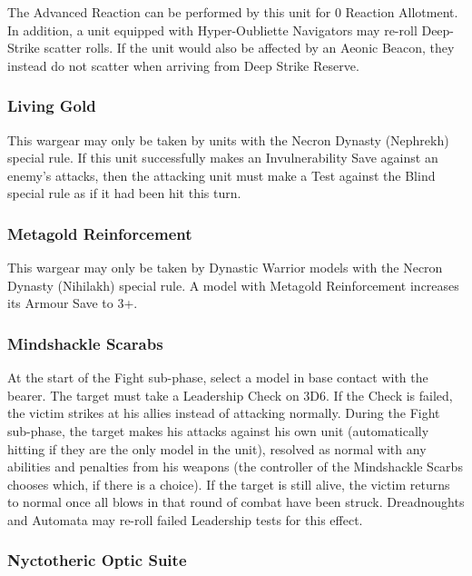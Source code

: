The  Advanced Reaction can be performed by this unit for 0 Reaction Allotment. In addition, a unit equipped with Hyper-Oubliette Navigators may re-roll Deep-Strike scatter rolls.  If the unit would also be affected by an Aeonic Beacon, they instead do not scatter when arriving from Deep Strike Reserve.

\subsubsection{Living Gold} \label{Living Gold}

This wargear may only be taken by units with the Necron Dynasty (Nephrekh) special rule. If this unit successfully makes an Invulnerability Save against an enemy's attacks, then the attacking unit must make a Test against the Blind special rule as if it had been hit this turn.

\subsubsection{Metagold Reinforcement} \label{Metagold Reinforcement}

This wargear may only be taken by Dynastic Warrior models with the Necron Dynasty (Nihilakh) special rule. A model with Metagold Reinforcement increases its Armour Save to 3+.

\subsubsection{Mindshackle Scarabs} \label{Mindshackle Scarabs}

At the start of the Fight sub-phase, select a model in base contact with the bearer. The target must take a Leadership Check on 3D6. If the Check is failed, the victim strikes at his allies instead of attacking normally. During the Fight sub-phase, the target makes his attacks against his own unit (automatically hitting if they are the only model in the unit), resolved as normal with any abilities and penalties from his weapons (the controller of the Mindshackle Scarbs chooses which, if there is a choice). If the target is still alive, the victim returns to normal once all blows in that round of combat have been struck. Dreadnoughts and Automata may re-roll failed Leadership tests for this effect.

\subsubsection{Nyctotheric Optic Suite} \label{Nyctotheric Optic Suite}

